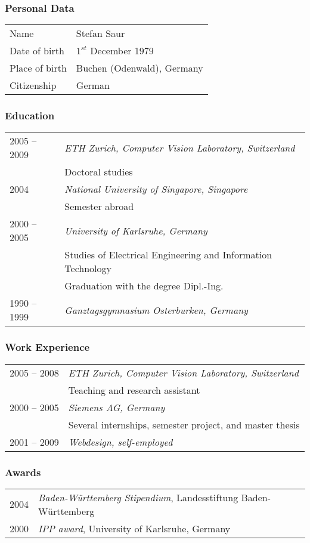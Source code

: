 \begin{curriculumvitae}

\subsubsection*{Personal Data}

\begin{tabular}{ll}
Name & Stefan Saur \\
Date of birth &  $1^{st}$ December 1979 \\
Place of birth & Buchen (Odenwald), Germany \\
Citizenship & German
\end{tabular}

\subsubsection*{Education}

\begin{tabular}{ll}
2005 -- 2009 & \emph{ETH Zurich, Computer Vision Laboratory, Switzerland} \\
             & Doctoral studies\\
2004         & \emph{National University of Singapore, Singapore} \\
             & Semester abroad\\
2000 -- 2005 & \emph{University of Karlsruhe, Germany}\\
             & Studies of Electrical Engineering and Information Technology \\
             & Graduation with the degree Dipl.-Ing.\\
1990 -- 1999 & \emph{Ganztagsgymnasium Osterburken, Germany} \\

\end{tabular}

\subsubsection*{Work Experience}
\begin{tabular}{ll}
2005 -- 2008 & \emph{ETH Zurich, Computer Vision Laboratory, Switzerland}\\
             & Teaching and research assistant\\
2000 -- 2005 & \emph{Siemens AG, Germany}\\
             & Several internships, semester project, and master thesis\\
2001 -- 2009 & \emph{Webdesign, self-employed}\\
\end{tabular}

\subsubsection*{Awards}
\begin{tabular}{ll}
2004 & \emph{Baden-W\"urttemberg Stipendium}, Landesstiftung Baden-W\"urttemberg \\
2000 & \emph{IPP award}, University of Karlsruhe, Germany \\
\end{tabular}


\end{curriculumvitae}
